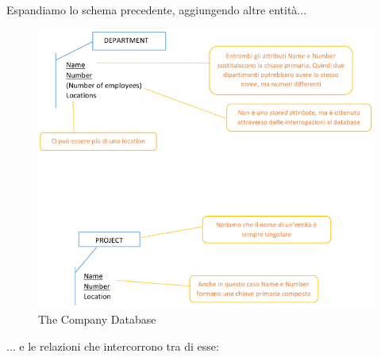 Espandiamo	lo	schema	precedente,	aggiungendo	altre entità...

\newpage
\begin{center}
\begin{figure}[H]
\centering
\includegraphics[scale=0.8]{figures/tcdBIG.png}
\caption{The Company Database} 
\end{figure}
\end{center}
\newpage

... e	le	relazioni	che	intercorrono	tra	di	esse:

